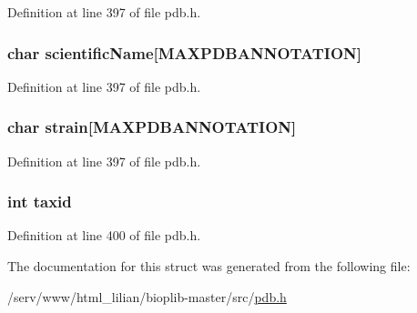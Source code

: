 Definition at line 397 of file pdb.\-h.

\hypertarget{struct__pdbsource_a7761f6c6c0d24703a78977a91dd07cf9}{
\subsubsection[{scientific\-Name}]{\setlength{\rightskip}{0pt plus 5cm}char scientific\-Name\mbox{[}{\bf M\-A\-X\-P\-D\-B\-A\-N\-N\-O\-T\-A\-T\-I\-O\-N}\mbox{]}}}\label{struct__pdbsource_a7761f6c6c0d24703a78977a91dd07cf9}


Definition at line 397 of file pdb.\-h.

\hypertarget{struct__pdbsource_a751a93e79b2982e0ad9f67d7dfe95ac5}{
\subsubsection[{strain}]{\setlength{\rightskip}{0pt plus 5cm}char strain\mbox{[}{\bf M\-A\-X\-P\-D\-B\-A\-N\-N\-O\-T\-A\-T\-I\-O\-N}\mbox{]}}}\label{struct__pdbsource_a751a93e79b2982e0ad9f67d7dfe95ac5}


Definition at line 397 of file pdb.\-h.

\hypertarget{struct__pdbsource_a61dafcf04c90116e256fd50ac91c4966}{
\subsubsection[{taxid}]{\setlength{\rightskip}{0pt plus 5cm}int taxid}}\label{struct__pdbsource_a61dafcf04c90116e256fd50ac91c4966}


Definition at line 400 of file pdb.\-h.



The documentation for this struct was generated from the following file\-:\begin{DoxyCompactItemize}
\item 
/serv/www/html\-\_\-lilian/bioplib-\/master/src/\hyperlink{pdb_8h}{pdb.\-h}\end{DoxyCompactItemize}
